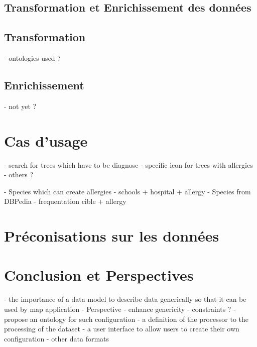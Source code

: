 \documentclass[a4paper,pagenum,english]{rnti}
\begin{document}
\subsection{Transformation et Enrichissement des données}

\subsection{Transformation}
- ontologies used ?

\subsection{Enrichissement}
	- not yet ?

\section{Cas d'usage}
- search for trees which have to be diagnose
- specific icon for trees with allergies
- others ?

- Species which can create allergies
- schools + hospital + allergy
- Species from DBPedia
- frequentation cible + allergy
\section{Préconisations sur les données}




\section{Conclusion et Perspectives}

- the importance of a data model to describe data generically so that it can be used by map application
	- Perspective
		- enhance genericity
			- constraints ?
	- propose an ontology for such configuration
	- a definition of the processor to the processing of the dataset
	- a user interface to allow users to create their own configuration	
	- other data formats
	



\end{document}

